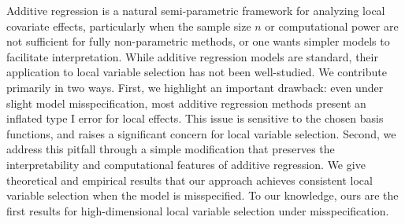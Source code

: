 Additive regression is a natural semi-parametric framework for analyzing local covariate effects, particularly when the sample size $n$ or computational power are not sufficient for fully non-parametric methods, or one wants simpler models to facilitate interpretation. While additive regression models are standard, their application to local variable selection has not been well-studied. We contribute primarily in two ways.
First, we highlight an important drawback: even under slight model misspecification, most additive regression methods present an inflated type I error for local effects.
 This issue is sensitive to the chosen basis functions,  and raises a significant concern for local variable selection. 
Second, we address this pitfall through a simple modification that preserves the interpretability and computational features of additive regression. We give theoretical and empirical results that our approach achieves consistent local variable selection when the model is misspecified. To our knowledge, ours are the first results for high-dimensional local variable selection under misspecification.



